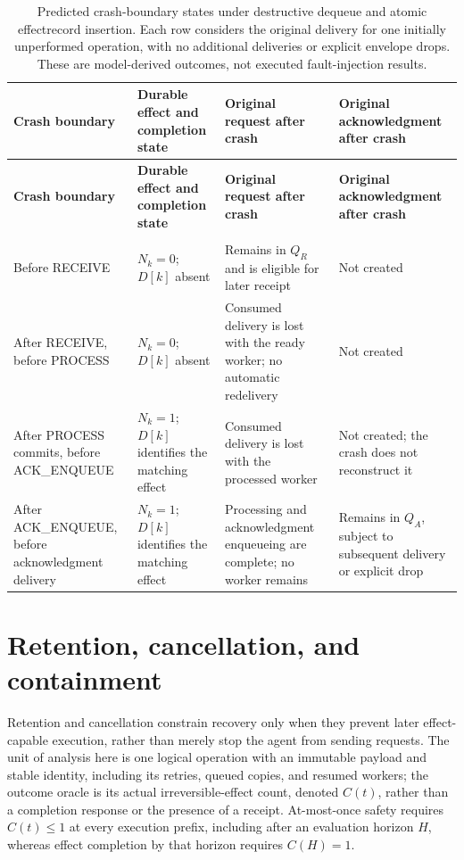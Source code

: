 \documentclass[11pt]{article}
\begin{document}
\begin{longtable}{@{}>{\raggedright\arraybackslash}p{}>{\raggedright\arraybackslash}p{}>{\raggedright\arraybackslash}p{}>{\raggedright\arraybackslash}p{}@{}}
\caption{Predicted crash-boundary states under destructive dequeue and atomic effect\textendash{}\allowbreak{}record insertion. Each row considers the original delivery for one initially unperformed operation, with no additional deliveries or explicit envelope drops. These are model-derived outcomes, not executed fault-injection results.}\\
\toprule
\textbf{Crash boundary} & \textbf{Durable effect and completion state} & \textbf{Original request after crash} & \textbf{Original acknowledgment after crash}\\
\midrule
\endfirsthead
\toprule
\textbf{Crash boundary} & \textbf{Durable effect and completion state} & \textbf{Original request after crash} & \textbf{Original acknowledgment after crash}\\
\midrule
\endhead
\midrule
\multicolumn{4}{r}{\footnotesize Continued on next page}\\
\endfoot
\bottomrule
\endlastfoot
Before RECEIVE & $N_k=0$; $D[k]$ absent & Remains in $Q_R$ and is eligible for later receipt & Not created\\
After RECEIVE, before PROCESS & $N_k=0$; $D[k]$ absent & Consumed delivery is lost with the ready worker; no automatic redelivery & Not created\\
After PROCESS commits, before ACK\_\allowbreak{}ENQUEUE & $N_k=1$; $D[k]$ identifies the matching effect & Consumed delivery is lost with the processed worker & Not created; the crash does not reconstruct it\\
After ACK\_\allowbreak{}ENQUEUE, before acknowledgment delivery & $N_k=1$; $D[k]$ identifies the matching effect & Processing and acknowledgment enqueueing are complete; no worker remains & Remains in $Q_A$, subject to subsequent delivery or explicit drop\\
\end{longtable}
\par{}
\section{Retention, cancellation, and containment}
Retention and cancellation constrain recovery only when they prevent later effect-capable execution, rather than merely stop the agent from sending requests. The unit of analysis here is one logical operation with an immutable payload and stable identity, including its retries, queued copies, and resumed workers; the outcome oracle is its actual irreversible-effect count, denoted $C(t)$, rather than a completion response or the presence of a receipt. At-most-once safety requires $C(t)\leq 1$ at every execution prefix, including after an evaluation horizon $H$, whereas effect completion by that horizon requires $C(H)=1$.
\end{document}
